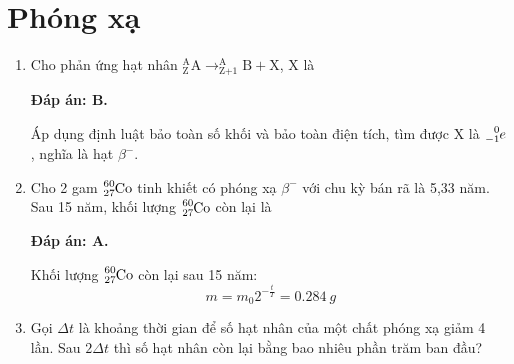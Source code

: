 \section{Phóng xạ}
\begin{enumerate}[label=\bfseries Câu \arabic*:]
	\item {}
	
	\cauhoi
	{Cho phản ứng hạt nhân $^{\text{A}}_{\text{Z}} \text{A} \longrightarrow ^{\text{A}}_{\text{Z+1}} \text{B} + \text{X}$, X là
	}
	
	\loigiai
	{		\textbf{Đáp án: B.}
		
		Áp dụng định luật bảo toàn số khối và bảo toàn điện tích, tìm được X là $\ce{^0_{-1}} e$, nghĩa là hạt $\beta^-$.
		
	}
		\item {}
	
	\cauhoi
	{Cho 2 gam $\ce{^{60}_{27} Co}$ tinh khiết có phóng xạ $\beta^{-}$ với chu kỳ bán rã là 5,33 năm. Sau 15 năm, khối lượng $\ce{^{60}_{27} Co}$ còn lại là
	}
	
	\loigiai
	{		\textbf{Đáp án: A.}
		
		Khối lượng $\ce{^{60}_{27} Co}$ còn lại sau 15 năm:
		$$m=m_0 2^{-\frac{t}{T}} = \SI{0.284}{g}$$
		
	}
	
	\item {}
	
	\cauhoi
	{Gọi $\Delta t$ là khoảng thời gian để số hạt nhân của một chất phóng xạ giảm 4 lần. Sau $2\Delta t$  thì số hạt nhân còn lại bằng bao nhiêu phần trăm ban đầu?
	}
	

\end{enumerate}

